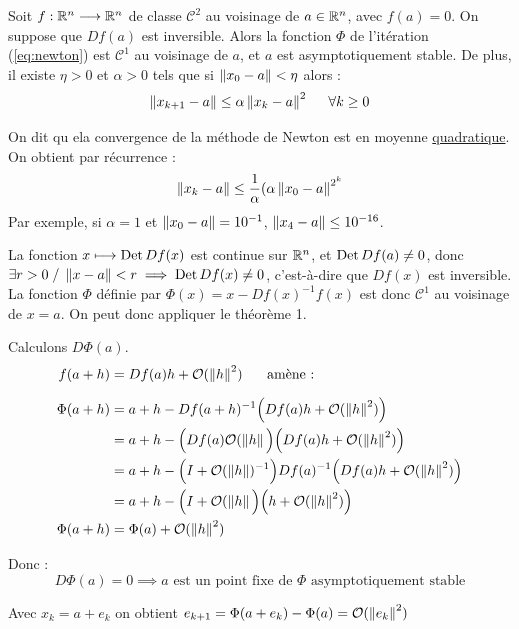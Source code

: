     \begin{ftheo}
        Soit $f : \mathbb{R}^n \longrightarrow \mathbb{R}^n$ de classe $\mathcal{C}^2$ au voisinage de $a \in \mathbb{R}^n$, avec $f(a) = 0$.
        On suppose que $Df(a)$ est inversible. Alors la fonction $\Phi$ de l'itération
        (\ref{eq:newton}) est $\mathcal{C}^1$ au voisinage de $a$, et $a$ est asymptotiquement
        stable. De plus, il existe $\eta > 0$ et $\alpha > 0$ tels que si
        $\left\lVert x_0 - a\right\rVert < \eta$ alors :
        \[
            \left\lVert x_{k+1} - a\right\rVert \leq \alpha \left\lVert x_k - a\right\rVert^2 \hspace{0.5cm} \forall k \geq 0
        \]
    \end{ftheo}

    \begin{remark}
        On dit qu ela convergence de la méthode de Newton est en moyenne \underline{quadratique}.
        On obtient par récurrence :
        \[
            \left\lVert x_k - a\right\rVert \leq \frac{1}{\alpha}(\alpha \left\lVert x_0 - a\right\rVert^{2^k}
        \]
        Par exemple, si $\alpha = 1$ et $\left\lVert x_0 - a\right\rVert = 10^{-1}$, $\left\lVert x_4 - a\right\rVert \leq 10^{-16}$.
    \end{remark}

    \begin{preuve}
        La fonction $x \longmapsto \operatorname{Det} Df(x)$ est continue sur $\mathbb{R}^n$, et $\operatorname{Det} Df(a) \ne 0$,
        donc $\exists r > 0 \; / \; \left\lVert x-a\right\rVert < r \implies \operatorname{Det} Df(x) \ne 0$,
        c'est-à-dire que $Df(x)$ est inversible. La fonction $\Phi$ définie par
        $\Phi(x) = x - Df(x)^{-1} f(x)$ est donc $\mathcal{C}^1$ au voisinage de $x=a$.
        On peut donc appliquer le théorème 1.

        Calculons $D\Phi(a)$.
        \begin{align*}
            f(a+h) & = Df(a)h + \mathcal{O}(\left\lVert h\right\rVert^2) \hspace{0.5cm} \text{ amène :} \\[6pt]
            \Phi(a+h) & = a + h - Df(a+h)^{-1} \Big(Df(a)h + \mathcal{O}(\left\lVert h\right\rVert^2) \Big) \\
            & = a + h - \Big( Df(a) \mathcal{O}(\left\lVert h\right\rVert \Big) \Big( Df(a)h + \mathcal{O}(\left\lVert h\right\rVert^2) \Big) \\
            & = a + h - \Big( I + \mathcal{O}(\left\lVert h\right\rVert)^{-1} \Big) Df(a)^{-1} \Big( Df(a)h + \mathcal{O}(\left\lVert h\right\rVert^2) \Big) \\
            & = a + h - \Big( I + \mathcal{O}(\left\lVert h\right\rVert \Big) \Big( h + \mathcal{O}(\left\lVert h\right\rVert^2) \Big) \\
            \Phi(a+h) & = \Phi(a) + \mathcal{O}(\left\lVert h\right\rVert^2)
        \end{align*}

        Donc :
        \[
            D\Phi(a) = 0 \implies \text{$a$ est un point fixe de $\Phi$ asymptotiquement stable}
        \]

        Avec $x_k = a + e_k$ on obtient $e_{k+1} = \Phi(a+e_k) - \Phi(a) = \mathcal{O}(\left\lVert e_k\right\rVert^2)$

    \end{preuve}

